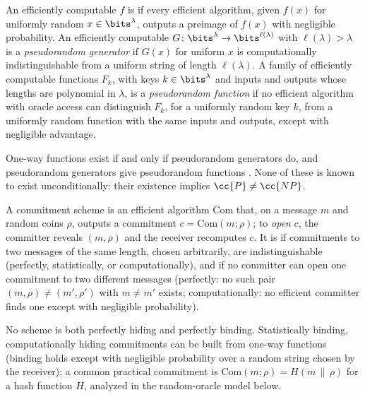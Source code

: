 \begin{refsection}
\begin{definition}\label{def:toolkit:owf}
An efficiently computable $f$ is  if every efficient algorithm, given $f(x)$ for uniformly random $x\in\bits^\lambda$, outputs a preimage of $f(x)$ with negligible probability. An efficiently computable $G\colon\bits^\lambda\to\bits^{\ell(\lambda)}$ with $\ell(\lambda)>\lambda$ is a \emph{pseudorandom generator} if $G(x)$ for uniform $x$ is computationally indistinguishable from a uniform string of length $\ell(\lambda)$. A family of efficiently computable functions $F_k$, with keys $k\in\bits^\lambda$ and inputs and outputs whose lengths are polynomial in $\lambda$, is a \emph{pseudorandom function} if no efficient algorithm with oracle access can distinguish $F_k$, for a uniformly random key $k$, from a uniformly random function with the same inputs and outputs, except with negligible advantage.
\end{definition}

One-way functions exist if and only if pseudorandom generators do, and pseudorandom generators give pseudorandom functions \parencite{Goldreich2001}. None of these is known to exist unconditionally: their existence implies $\cc{P}\ne\cc{NP}$.

\begin{definition}\label{def:toolkit:commitment}
A commitment scheme is an efficient algorithm $\mathrm{Com}$ that, on a message $m$ and random coins $\rho$, outputs a commitment $c=\mathrm{Com}(m;\rho)$; to \emph{open} $c$, the committer reveals $(m,\rho)$ and the receiver recomputes $c$. It is  if commitments to two messages of the same length, chosen arbitrarily, are indistinguishable (perfectly, statistically, or computationally), and  if no committer can open one commitment to two different messages (perfectly: no such pair $(m,\rho)\ne(m',\rho')$ with $m\ne m'$ exists; computationally: no efficient committer finds one except with negligible probability).
\end{definition}

No scheme is both perfectly hiding and perfectly binding. Statistically binding, computationally hiding commitments can be built from one-way functions \parencite{Naor1991} (binding holds except with negligible probability over a random string chosen by the receiver); a common practical commitment is $\mathrm{Com}(m;\rho)=H(m\,\|\,\rho)$ for a hash function $H$, analyzed in the random-oracle model below.


\end{refsection}
